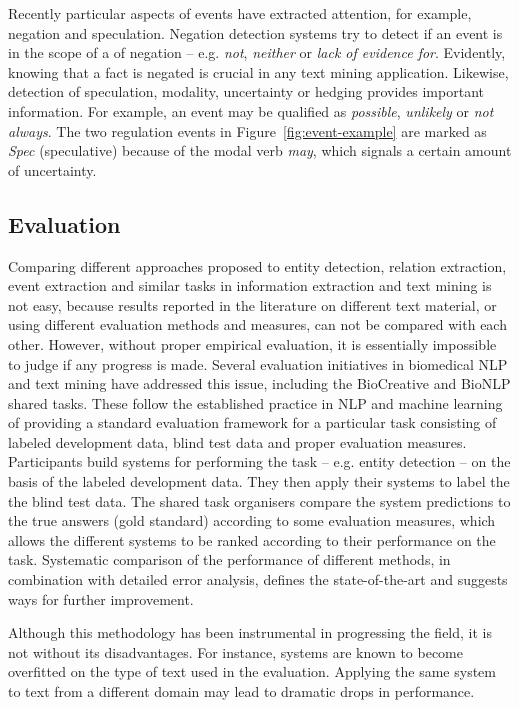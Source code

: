 Recently particular aspects of events have extracted attention, for example, negation and speculation. Negation detection systems try to detect if an event is in the scope of a of negation -- e.g. \emph{not}, \emph{neither} or \emph{lack of evidence for}. 
Evidently, knowing that a fact is negated is crucial in any text mining application.
Likewise, detection of speculation, modality, uncertainty or hedging provides important information.
For example, an event may be qualified as \emph{possible}, \emph{unlikely} or \emph{not always}.
The two regulation events in Figure~\ref{fig:event-example} are marked as \emph{Spec} (speculative) because of the modal verb \emph{may}, which signals a certain amount of uncertainty.

\subsection{Evaluation}

Comparing different approaches proposed to entity detection, relation extraction, event extraction and similar tasks in information extraction and text mining is not easy, because results reported in the literature on different text material, or using different evaluation methods and measures, can not be compared with each other.
However, without proper empirical evaluation, it is essentially impossible to judge if any progress is made.
Several evaluation initiatives in biomedical NLP and text mining have addressed this issue, including the BioCreative and BioNLP shared tasks.
These follow the established practice in NLP and machine learning of providing a standard evaluation framework for a particular task consisting of labeled development data, blind test data and proper evaluation measures.   
Participants build systems for performing the task -- e.g. entity detection -- on the basis of the labeled development data.
They then apply their systems to label the the blind test data.
The shared task organisers compare the system predictions to the true answers (gold standard) according to some evaluation measures, which allows the different systems to be ranked according to their performance on the task.
Systematic comparison of the performance of different methods, in combination with detailed error analysis, defines the state-of-the-art and suggests ways for further improvement.

Although this methodology has been instrumental in progressing the field, it is not without its disadvantages.
For instance, systems are known to become overfitted on the type of text used in the evaluation.
Applying the same system to text from a different domain may lead to dramatic drops in performance. 

